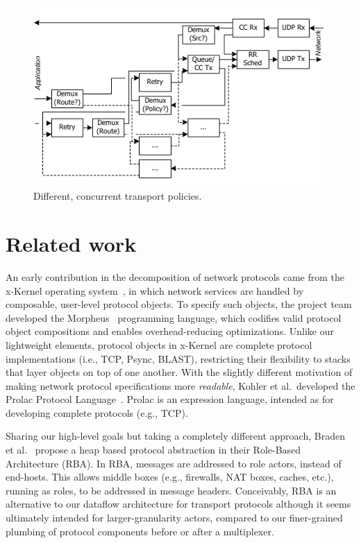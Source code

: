 \begin{figure}
\centerline{\includegraphics{figures/Classification}}
\caption{Different, concurrent transport policies.}
\label{fig:Classification}
\end{figure}

\section{Related work}
\label{sec:related}

An early contribution in the decomposition of network protocols came
from the x-Kernel operating system~\cite{x-kernel}, in which network
services are handled by composable, user-level protocol objects. To
specify such objects, the project team developed the Morpheus~\cite{Morpheus}
programming language, which codifies valid protocol object compositions
and enables overhead-reducing optimizations.  Unlike our lightweight
elements, protocol objects in x-Kernel are complete protocol
implementations (i.e., TCP, Psync, BLAST), restricting their flexibility
to stacks that layer objects on top of one another.
With the slightly different motivation of making network protocol specifications more
\emph{readable}, Kohler et al.\ developed the Prolac Protocol
Language~\cite{prolac}. Prolac is an expression language, intended as for developing
complete protocols (e.g., TCP).

Sharing our high-level goals but taking a completely different approach,
Braden et al.~\cite{rba} propose a heap based protocol abstraction in
their Role-Based Architecture (RBA). 
In RBA, messages are addressed to role actors, instead of end-hosts. This allows 
middle boxes (e.g., firewalls, NAT boxes, caches, etc.), running as roles, to be addressed 
in message headers. Conceivably, RBA is an alternative to our dataflow
architecture for transport protocols although it seems ultimately
intended for larger-granularity actors, compared to our finer-grained
plumbing of protocol components before or after a multiplexer.
% 
% 

